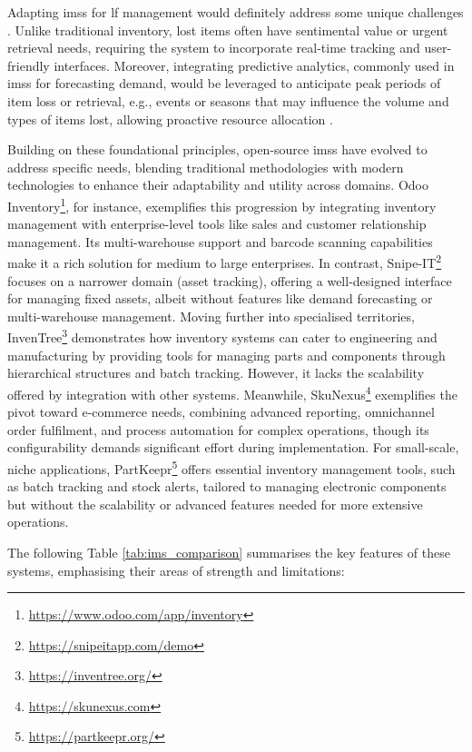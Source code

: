 Adapting \acp{ims} for \ac{lf} management would definitely address some unique challenges \cite{Pauliina2024}. Unlike traditional inventory, lost items often have sentimental value or urgent retrieval needs, requiring the system to incorporate real-time tracking and user-friendly interfaces. Moreover, integrating predictive analytics, commonly used in \acp{ims} for forecasting demand, would be leveraged to anticipate peak periods of item loss or retrieval, e.g., events or seasons that may influence the volume and types of items lost, allowing proactive resource allocation \cite{Prabakaran2023}.

Building on these foundational principles, open-source \acp{ims} have evolved to address specific needs, blending traditional methodologies with modern technologies to enhance their adaptability and utility across domains. Odoo Inventory\footnote{\url{https://www.odoo.com/app/inventory}}, for instance, exemplifies this progression by integrating inventory management with enterprise-level tools like sales and customer relationship management. Its multi-warehouse support and barcode scanning capabilities make it a rich solution for medium to large enterprises. In contrast, Snipe-IT\footnote{\url{https://snipeitapp.com/demo}} focuses on a narrower domain (asset tracking), offering a well-designed interface for managing fixed assets, albeit without features like demand forecasting or multi-warehouse management. Moving further into specialised territories, InvenTree\footnote{\url{https://inventree.org/}} demonstrates how inventory systems can cater to engineering and manufacturing by providing tools for managing parts and components through hierarchical structures and batch tracking. However, it lacks the scalability offered by integration with other systems. Meanwhile, SkuNexus\footnote{\url{https://skunexus.com}} exemplifies the pivot toward e-commerce needs, combining advanced reporting, omnichannel order fulfilment, and process automation for complex operations, though its configurability demands significant effort during implementation. For small-scale, niche applications, PartKeepr\footnote{\url{https://partkeepr.org/}} offers essential inventory management tools, such as batch tracking and stock alerts, tailored to managing electronic components but without the scalability or advanced features needed for more extensive operations.

The following Table \ref{tab:ims_comparison} summarises the key features of these systems, emphasising their areas of strength and limitations:

